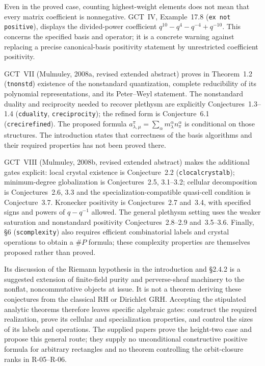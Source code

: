 \documentclass[11pt,a4paper]{article}
\theoremstyle{definition}\newtheorem{definition}{Definition}
\begin{document}
Even in the proved case, counting highest-weight elements does not
mean that every matrix coefficient is nonnegative. GCT~IV,
Example~17.8 (\texttt{ex not positive}), displays the divided-power
coefficient $q^{10}-q^4-q^{-4}+q^{-10}$. This concerns the specified
basis and operator; it is a concrete warning against replacing a
precise canonical-basis positivity statement by unrestricted
coefficient positivity.

GCT~VII (Mulmuley, 2008a, revised extended abstract) proves in
Theorem~1.2 (\texttt{tnonstd}) existence of the nonstandard
quantization, complete reducibility of its polynomial
representations, and its Peter--Weyl statement. The nonstandard
duality and reciprocity needed to recover plethysm are explicitly
Conjectures~1.3--1.4 (\texttt{cduality}, \texttt{creciprocity});
the refined form is Conjecture~6.1 (\texttt{crecirefined}).
The proposed formula
$a_{\lambda,\mu}^{\pi}=\sum_\alpha
m_\lambda^\alpha n_\pi^\alpha$ is conditional on those structures.
The introduction states that correctness of the basis algorithms
and their required properties has not been proved there.

GCT~VIII (Mulmuley, 2008b, revised extended abstract) makes the
additional gates explicit: local crystal existence is Conjecture~2.2
(\texttt{clocalcrystalb}); minimum-degree globalization is
Conjectures~2.5, 3.1--3.2; cellular decomposition is Conjectures~2.6,
3.3 and the specialization-compatible quasi-cell condition is
Conjecture~3.7. Kronecker positivity is Conjectures~2.7 and~3.4,
with specified signs and powers of $q-q^{-1}$ allowed. The general
plethysm setting uses the weaker saturation and nonstandard
positivity Conjectures~2.8--2.9 and~3.5--3.6. Finally, \S6
(\texttt{scomplexity}) also requires efficient combinatorial
labels and crystal operations to obtain a $\#P$ formula; these
complexity properties are themselves proposed rather than proved.

Its discussion of the Riemann hypothesis in the introduction and
\S2.4.2 is a suggested extension of finite-field purity and
perverse-sheaf machinery to the nonflat, noncommutative objects at
issue. It is not a theorem deriving these conjectures from the
classical RH or Dirichlet GRH. Accepting the stipulated analytic
theorems therefore leaves specific algebraic gates: construct the
required realization, prove its cellular and specialization
properties, and control the sizes of its labels and operations.
The supplied papers prove the height-two case and propose this
general route; they supply no unconditional constructive positive
formula for arbitrary rectangles and no theorem controlling the
orbit-closure ranks in R-05--R-06.
\end{document}
